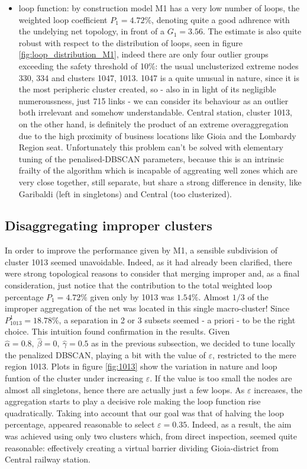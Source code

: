 \documentclass[11pt,twoside]{report}
\begin{document}
\begin{itemize}
	\item loop function: by construction model M1 has a very low number of loops, the weighted loop coefficient $ P_1=4.72\% $, denoting quite a good adhrence with the undelying net topology, in front of a $ G_1=3.56 $. The estimate is also quite robust with respect to the distribution of loops, seen in figure \ref{fig:loop_distribution_M1}, indeed there are only four outlier groups exceeding the safety threshold of 10\%: the usual unclusterized extreme nodes 330, 334 and clusters 1047, 1013. 1047 is a quite unusual in nature, since it is the most peripheric cluster created, so - also in in light of its negligible numeroussness, just 715 links - we can consider its behaviour as an outlier both irrelevant and somehow understandable. Central station, cluster 1013, on the other hand, is definitely the product of an extreme overaggregation due to the high proximity of business locations like Gioia and the Lombardy Region seat. Unfortunately this problem can't be solved with elementary tuning of the penalised-DBSCAN parameters, because this is an intrinsic frailty of the algorithm which is incapable of aggreating well zones which are very close together, still separate, but share a strong difference in density, like Garibaldi (left in singletons) and Central (too clusterized).

\end{itemize}

\subsection{Disaggregating improper clusters}
In order to improve the performance given by M1, a sensible subdivision of cluster 1013 seemed unavoidable. Indeed, as it had already been clarified, there were strong topological reasons to consider that merging improper and, as a final consideration, just notice that the contribution to the total weighted loop percentage $ P_1=4.72\% $ given only by 1013 was $ 1.54\% $. Almost $ 1/3 $ of the improper aggregation of the net was located in this single macro-cluster! Since $ P_{1013}^1=18.78\% $, a separation in 2 or 3 subsets seemed - a priori - to be the right choice. This intuition found confirmation in the results. Given $ \hat{\alpha}=0.8,\ \hat{\beta}=0,\ \hat{\gamma}=0.5 $ as in the previous subsection, we decided to tune locally the penalized DBSCAN, playing a bit with the value of $ \varepsilon $, restricted to the mere region 1013. Plots in figure \ref{fig:1013} show the variation in  nature and loop funtion of the cluster under increasing $ \varepsilon $. If the value is too small the nodes are almost all singletons, hence there are actually just a few loops. As $ \varepsilon $ increases, the aggregation starts to play a decisive role making the loop function rise quadratically. Taking into account that our goal was that of halving the loop percentage, appeared reasonable to select $\varepsilon =0.35$. Indeed, as a result, the aim was achieved using only two clusters which, from direct inspection, seemed quite reasonable: effectively creating a virtual barrier dividing Gioia-district from Central railway station.
\end{document}
